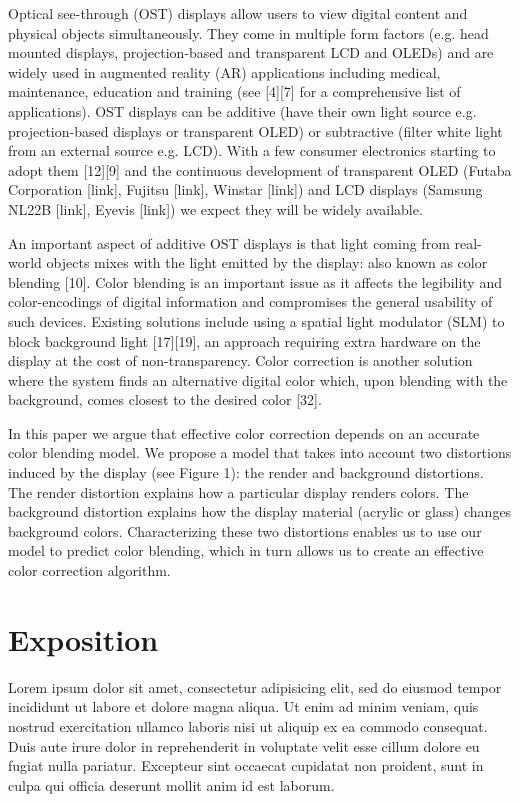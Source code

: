 \documentclass[annual]{acmsiggraph}
\begin{document}
Optical see-through (OST) displays allow users to view digital content and physical objects simultaneously. They come in multiple form factors (e.g. head mounted displays, projection-based and transparent LCD and OLEDs) and are widely used in augmented reality (AR) applications including medical, maintenance, education and training (see [4][7] for a comprehensive list of applications). OST displays can be additive (have their own light source e.g. projection-based displays or transparent OLED) or subtractive (filter white light from an external source e.g. LCD). With a few consumer electronics starting to adopt them [12][9] and the continuous development of transparent OLED (Futaba Corporation [link], Fujitsu [link], Winstar [link]) and LCD displays (Samsung NL22B [link], Eyevis [link]) we expect they will be widely available.

An important aspect of additive OST displays is that light coming from real-world objects mixes with the light emitted by the display: also known as color blending [10]. Color blending is an important issue as it affects the legibility and color-encodings of digital information and compromises the general usability of such devices. Existing solutions include using a spatial light modulator (SLM) to block background light [17][19], an approach requiring extra hardware on the display at the cost of non-transparency. Color correction is another solution where the system finds an alternative digital color which, upon blending with the background, comes closest to the desired color [32].

In this paper we argue that effective color correction depends on an accurate color blending model. We propose a model that takes into account two distortions induced by the display (see Figure 1): the render and background distortions. The render distortion explains how a particular display renders colors. The background distortion explains how the display material (acrylic or glass) changes background colors. Characterizing these two distortions enables us to use our model to predict color blending, which in turn allows us to create an effective color correction algorithm.

\section{Exposition}

Lorem ipsum dolor sit amet, consectetur adipisicing elit, sed do
eiusmod tempor incididunt ut labore et dolore magna aliqua. Ut enim ad
minim veniam, quis nostrud exercitation ullamco laboris nisi ut
aliquip ex ea commodo consequat. Duis aute irure dolor in
reprehenderit in voluptate velit esse cillum dolore eu fugiat nulla
pariatur. Excepteur sint occaecat cupidatat non proident, sunt in
culpa qui officia deserunt mollit anim id est laborum.
\end{document}
